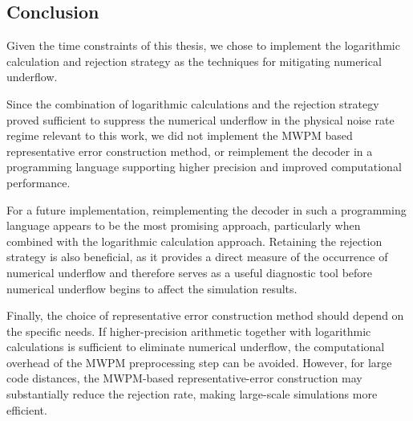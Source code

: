 \subsection{Conclusion}

Given the time constraints of this thesis, we chose to implement the logarithmic calculation and rejection strategy as the techniques for mitigating numerical underflow.

Since the combination of logarithmic calculations and the rejection strategy proved sufficient to suppress the numerical underflow in the physical noise rate regime relevant to this work, 
we did not implement the MWPM based representative error construction method, 
or reimplement the decoder in a programming language supporting higher precision and improved computational performance. 

For a future implementation, reimplementing the decoder in such a programming language appears to be the most promising approach, 
particularly when combined with the logarithmic calculation approach.
Retaining the rejection strategy is also beneficial, as it provides a direct measure of the occurrence of numerical underflow 
and therefore serves as a useful diagnostic tool before numerical underflow begins to affect the simulation results.

Finally, the choice of representative error construction method should depend on the specific needs. 
If higher-precision arithmetic together with logarithmic calculations is sufficient to eliminate numerical underflow, 
the computational overhead of the MWPM preprocessing step can be avoided. 
However, for large code distances, the MWPM-based representative-error construction may substantially reduce the rejection rate, 
making large-scale simulations more efficient.
